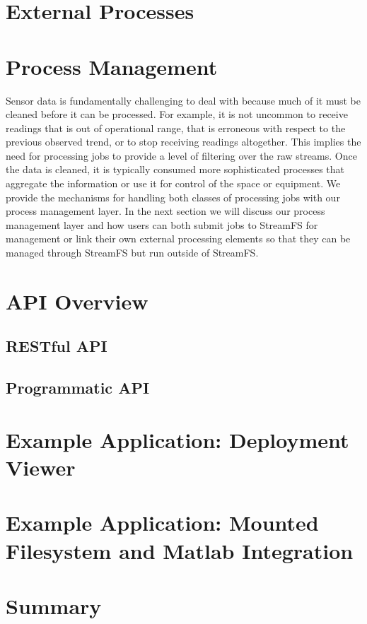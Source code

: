 \section{External Processes}


\section{Process Management}
%
Sensor data is fundamentally challenging to deal with because much of it must be cleaned before it can be processed.  For example,
it is not uncommon to receive readings that is out of operational range, that is erroneous with respect to the previous observed trend,
or to stop receiving readings altogether.  This implies the need for processing jobs to provide a level of filtering over the raw streams.
Once the data is cleaned, it is typically consumed more sophisticated processes that aggregate the information or use it for control
of the space or equipment.  We provide the mechanisms for handling both classes of processing jobs with our process management layer.
In the next section we will discuss our process management layer and how users can both submit jobs to StreamFS for management or link
their own external processing elements so that they can be managed through StreamFS but run outside of StreamFS.






\section{API Overview}
	\subsection{RESTful API}
	\subsection{Programmatic API}
\section{Example Application: Deployment Viewer}
\section{Example Application: Mounted Filesystem and Matlab Integration}
\section{Summary}




